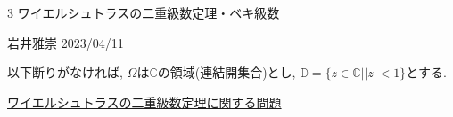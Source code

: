 \documentclass[dvipdfmx,a4paper,11pt]{article}
\newcommand{\C}{\mathbb{C}}
\newcommand{\D}{\mathbb{D}}
\theoremstyle{definition}
\begin{document}

\begin{center}
{\Large 3 ワイエルシュトラスの二重級数定理・ベキ級数}
\end{center}

\begin{flushright}
 岩井雅崇 2023/04/11
\end{flushright}
以下断りがなければ, $\Omega$は$\C$の領域(連結開集合)とし, $\D= \{ z \in \C | |z|<1\}$とする. 

\vspace{12pt}
\hspace{-24pt}\underline{ワイエルシュトラスの二重級数定理に関する問題}
\end{document}
